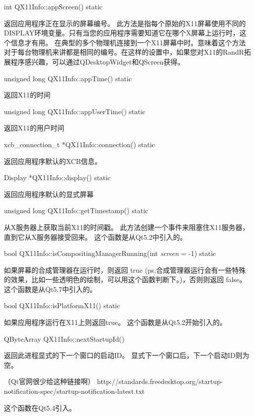 \begin{itemSpace}
	int QX11Info::appScreen() static

	返回应用程序正在显示的屏幕编号。 此方法是指每个原始的X11屏幕使用不同的DISPLAY环境变量。只有当您的应用程序需要知道它在哪个X屏幕上运行时，这个信息才有用。 在典型的多个物理机连接到一个X11屏幕中时。意味着这个方法对于每台物理机来讲都是相同的编号。在这样的设置中，如果您对X11的RandR拓展程序感兴趣，可以通过QDesktopWidget和QScreen获得。
\end{itemSpace}

\begin{itemSpace}
	unsigned long QX11Info::appTime() static

	返回X11的时间
\end{itemSpace}

\begin{itemSpace}
	unsigned long QX11Info::appUserTime() static

	返回X11的用户时间
\end{itemSpace}

\begin{itemSpace}
	xcb\_connection\_t *QX11Info::connection() static

	返回应用程序默认的XCB信息。
\end{itemSpace}

\begin{itemSpace}
	Display *QX11Info::display() static

	返回应用程序默认的显式屏幕
\end{itemSpace}

\begin{itemSpace}
	unsigned long QX11Info::getTimestamp() static

	从X服务器上获取当前X11的时间戳。 此方法创建一个事件来阻塞住X11服务器，直到它从X服务器接受回来。 这个函数是从Qt5.2中引入的。
\end{itemSpace}

\begin{itemSpace}
	bool QX11Info::isCompositingManagerRunning(int \emph{screen} = -1) static

	如果屏幕的合成管理器在运行时，则返回 true (ps,合成管理器运行会有一些特殊的效果，比如一些透明色的绘制，可以用这个函数判断下。)，否则则返回 false。 这个函数是从Qt5.7中引入的。
\end{itemSpace}

\begin{itemSpace}
	bool QX11Info::isPlatformX11() static

	如果应用程序运行在X11上则返回true。 这个函数是从Qt5.2开始引入的。

\end{itemSpace}
\begin{itemSpace}
	QByteArray QX11Info::nextStartupId()

	返回此进程显式的下一个窗口的启动ID。 显式下一个窗口后，下一个启动ID则为空。

	（Qt官网很少给这种链接啊）
	http://standards.freedesktop.org/startup-notification-spec/startup-notification-latest.txt

	这个函数在Qt5.4引入。
\end{itemSpace}

